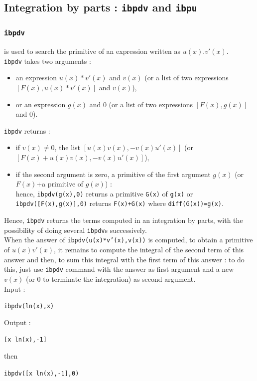 \documentclass[a4paper,11pt]{book}
\begin{document}
\subsection{Integration by parts : {\tt ibpdv} and {\tt ibpu}}
\subsubsection{\tt ibpdv}
 is used to search the primitive of an expression written 
as $u(x).v'(x)$.\\
{\tt ibpdv} takes two arguments :
\begin{itemize}
\item an expression 
 $u(x) * v'(x)$ and $v(x)$ (or a list of two expressions 
$[F(x), u(x)*v'(x)]$ and $v(x)$),
\item or an expression $g(x)$ and $0$ (or a list of two expressions 
$[F(x), g(x)]$ and $0$).
\end{itemize}
{\tt ibpdv} returns :
\begin{itemize}
\item if $v(x) \neq 0$, the list $[u(x) v(x),-v(x) u'(x)]$ (or 
$[F(x)+u(x) v(x),-v(x) u'(x)]$),
\item if the second argument is zero, a primitive of the first argument 
$g(x)$ (or $F(x)$+a primitive of $g(x)$) :\\
hence, {\tt ibpdv(g(x),0)} returns a primitive {\tt G(x)} of {\tt g(x)} or \\
{\tt ibpdv([F(x),g(x)],0)} returns {\tt F(x)+G(x)} where {\tt diff(G(x))=g(x)}.
\end{itemize}
Hence, {\tt ibpdv} returns the terms computed in an integration by parts, 
with the possibility of doing several {\tt ibpdv}s successively.\\
When the answer of {\tt ibpdv(u(x)*v'(x),v(x))} is computed, to obtain a 
primitive of $u(x) v'(x)$, it remains to 
compute the integral of the second term of this answer and then, to sum this 
integral with the first term of this answer : to do this, just use  
{\tt ibpdv} command with the answer as first argument and  
a new $v(x)$ (or $0$ to terminate the integration) as second argument.\\ 
Input :
\begin{center}{\tt ibpdv(ln(x),x) }\end{center}
Output :
\begin{center}{\tt [x ln(x),-1]}\end{center}
then
\begin{center}{\tt ibpdv([x ln(x),-1],0) }\end{center}
\end{document}
